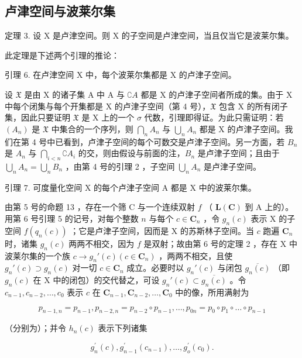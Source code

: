\subsection{卢津空间与波莱尔集}

定理 3. 设 X 是卢津空间。则 X 的子空间是卢津空间，当且仅当它是波莱尔集。

此定理是下述两个引理的推论：

引理 6. 在卢津空间 X 中，每个波莱尔集都是 X 的卢津子空间。

设 \(\mathfrak{X}\) 是由 X 的诸子集 A 中 A 与 \(\complement A\) 都是 X 的卢津子空间者所成的集。由于 X 中每个闭集与每个开集都是 X 的卢津子空间（第 4 号），\(\mathfrak{X}\) 包含 X 的所有闭子集，因此只要证明 \(\mathfrak{X}\) 是 X 上的一个 \(\sigma\) 代数，引理即得证。为此只需证明：若 \((A_n)\) 是 \(\mathfrak{X}\) 中集合的一个序列，则 \(\bigcap_{n} A_n\) 与 \(\bigcup_{n} A_n\) 都是 X 的卢津子空间。我们在第 4 号中已看到，卢津子空间的每个可数交是卢津子空间。另一方面，若 \(B_n\) 是 \(A_n\) 与 \(\bigcap_{i < n} \complement A_i\) 的交，则由假设与前面的注，\(B_n\) 是卢津子空间；且由于 \(\bigcup_{n} A_n = \bigcup_{n} B_n\) ，由第 4 号的引理 2 ，子空间 \(\bigcup_{n} A_n\) 是卢津子空间。

引理 7. 可度量化空间 X 的每个卢津子空间 A 都是 X 中的波莱尔集。

由第 5 号的命题 13 ，存在一个筛 C 与一个连续双射 \(f\) （ \(\mathbf{L}(\mathbf{C})\) 到 A 上的）。用第 6 号引理 5 的记号，对每个整数 \(n\) 与每个 \(c \in \mathbf{C}_n\) ，令 \(g_n(c)\) 表示 X 的子空间 \(f(q_n(c))\) ；它是卢津子空间，因而是 X 的苏斯林子空间。当 \(c\) 跑遍 \(\mathbf{C}_n\) 时，诸集 \(g_n(c)\) 两两不相交，因为 \(f\) 是双射；故由第 6 号的定理 2 ，存在 X 中波莱尔集的一个族 \(c \to g_n'(c) (c \in \mathbf{C}_n)\) ，两两不相交，且使 \(g_n'(c) \supset g_n(c)\) 对一切 \(c \in \mathbf{C}_n\) 成立。必要时以 \(g_n'(c)\) 与闭包 \(\overline{g_n(c)}\) （即 \(g_n(c)\) 在 X 中的闭包）的交代替之，可设 \(g_n'(c) \subset \overline{g_n(c)}\) 。令 \(c_{n-1}, c_{n-2}, \ldots, c_0\) 表示 \(c\) 在 \(\mathbf{C}_{n-1}, \mathbf{C}_{n-2}, \ldots, \mathbf{C}_0\) 中的像，所用满射为

\[
p _ {n - 1, n} = p _ {n - 1}, p _ {n - 2, n} = p _ {n - 2} \circ p _ {n - 1}, \dots , p _ {0 n} = p _ {0} \circ p _ {1} \circ \dots \circ p _ {n - 1}
\]

（分别为）；并令 \(h_n(c)\) 表示下列诸集

\[
g _ {n} ^ {\prime} (c), g _ {n - 1} ^ {\prime} \left(c _ {n - 1}\right), \dots , g _ {o} ^ {\prime} \left(c _ {0}\right).
\]


